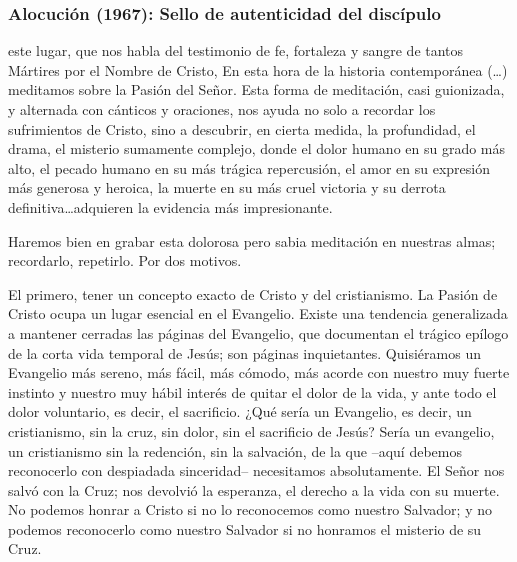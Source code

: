 \subsubsection{Alocución (1967): Sello de autenticidad del discípulo}


\begin{body}
 este lugar, que nos habla del testimonio de fe, fortaleza y sangre de tantos Mártires por el Nombre de Cristo,  En esta hora de la historia contemporánea (\ldots) meditamos sobre la Pasión del Señor. Esta forma de meditación, casi guionizada, y alternada con cánticos y oraciones, nos ayuda no solo a recordar los sufrimientos de Cristo, sino a descubrir, en cierta medida, la profundidad, el drama, el misterio sumamente complejo, donde el dolor humano en su grado más alto, el pecado humano en su más trágica repercusión, el amor en su expresión más generosa y heroica, la muerte en su más cruel victoria y su derrota definitiva\ldots adquieren la evidencia más impresionante. 


Haremos bien en grabar esta dolorosa pero sabia meditación en nuestras almas; recordarlo, repetirlo. Por dos motivos. 

El primero, tener un concepto exacto de Cristo y del cristianismo. La Pasión de Cristo ocupa un lugar esencial en el Evangelio. Existe una tendencia generalizada a mantener cerradas las páginas del Evangelio, que documentan el trágico epílogo de la corta vida temporal de Jesús; son páginas inquietantes. Quisiéramos un Evangelio más sereno, más fácil, más cómodo, más acorde con nuestro muy fuerte instinto y nuestro muy hábil interés de quitar el dolor de la vida, y ante todo el dolor voluntario, es decir, el sacrificio. ¿Qué sería un Evangelio, es decir, un cristianismo, sin la cruz, sin dolor, sin el sacrificio de Jesús? Sería un evangelio, un cristianismo sin la redención, sin la salvación, de la que –aquí debemos reconocerlo con despiadada sinceridad– necesitamos absolutamente. El Señor nos salvó con la Cruz; nos devolvió la esperanza, el derecho a la vida con su muerte. No podemos honrar a Cristo si no lo reconocemos como nuestro Salvador; y no podemos reconocerlo como nuestro Salvador si no honramos el misterio de su Cruz. 


\newpage 
{}


\end{body}

